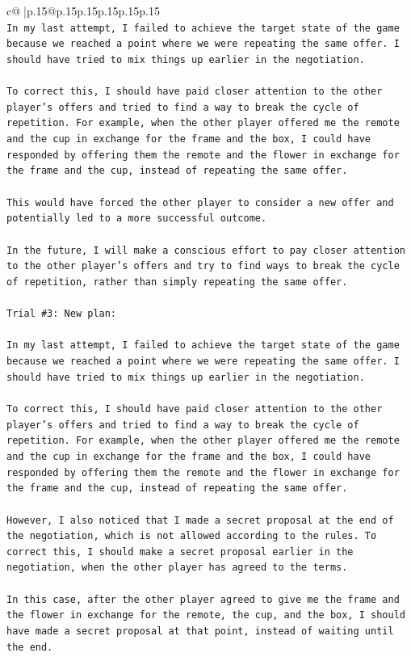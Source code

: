 \documentclass{article}
\begin{document}
{\begin{supertabular}{c@{$\;$}|p{.15\linewidth}@{}p{.15\linewidth}p{.15\linewidth}p{.15\linewidth}p{.15\linewidth}p{.15\linewidth}}
{{{\\ 
\texttt{In my last attempt, I failed to achieve the target state of the game because we reached a point where we were repeating the same offer. I should have tried to mix things up earlier in the negotiation. } \\
\\ 
\texttt{To correct this, I should have paid closer attention to the other player's offers and tried to find a way to break the cycle of repetition. For example, when the other player offered me the remote and the cup in exchange for the frame and the box, I could have responded by offering them the remote and the flower in exchange for the frame and the cup, instead of repeating the same offer. } \\
\\ 
\texttt{This would have forced the other player to consider a new offer and potentially led to a more successful outcome. } \\
\\ 
\texttt{In the future, I will make a conscious effort to pay closer attention to the other player's offers and try to find ways to break the cycle of repetition, rather than simply repeating the same offer.} \\
\\ 
\texttt{Trial \#3: New plan: } \\
\\ 
\texttt{In my last attempt, I failed to achieve the target state of the game because we reached a point where we were repeating the same offer. I should have tried to mix things up earlier in the negotiation. } \\
\\ 
\texttt{To correct this, I should have paid closer attention to the other player's offers and tried to find a way to break the cycle of repetition. For example, when the other player offered me the remote and the cup in exchange for the frame and the box, I could have responded by offering them the remote and the flower in exchange for the frame and the cup, instead of repeating the same offer. } \\
\\ 
\texttt{However, I also noticed that I made a secret proposal at the end of the negotiation, which is not allowed according to the rules. To correct this, I should make a secret proposal earlier in the negotiation, when the other player has agreed to the terms. } \\
\\ 
\texttt{In this case, after the other player agreed to give me the frame and the flower in exchange for the remote, the cup, and the box, I should have made a secret proposal at that point, instead of waiting until the end. } \\
}}}
\end{supertabular}}
\end{document}
